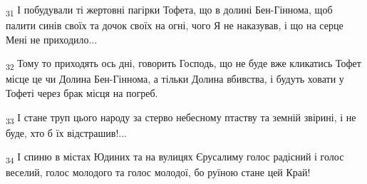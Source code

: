 \begin{tcolorbox}
\textsubscript{31} І побудували ті жертовні пагірки Тофета, що в долині Бен-Гіннома, щоб палити синів своїх та дочок своїх на огні, чого Я не наказував, і що на серце Мені не приходило...
\end{tcolorbox}
\begin{tcolorbox}
\textsubscript{32} Тому то приходять ось дні, говорить Господь, що не буде вже кликатись Тофет місце це чи Долина Бен-Гіннома, а тільки Долина вбивства, і будуть ховати у Тофеті через брак місця на погреб.
\end{tcolorbox}
\begin{tcolorbox}
\textsubscript{33} І стане труп цього народу за стерво небесному птаству та земній звірині, і не буде, хто б їх відстрашив!...
\end{tcolorbox}
\begin{tcolorbox}
\textsubscript{34} І спиню в містах Юдиних та на вулицях Єрусалиму голос радісний і голос веселий, голос молодого та голос молодої, бо руїною стане цей Край!
\end{tcolorbox}

